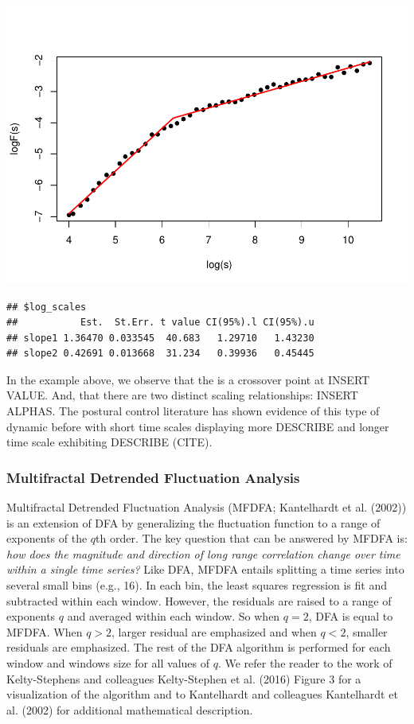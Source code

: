 \documentclass[
  man]{apa6}
\begin{document}
\includegraphics{fractal_regression_paper_brm_files/figure-latex/unnamed-chunk-6-1.pdf}

\begin{verbatim}
## $log_scales
##           Est.  St.Err. t value CI(95%).l CI(95%).u
## slope1 1.36470 0.033545  40.683   1.29710   1.43230
## slope2 0.42691 0.013668  31.234   0.39936   0.45445
\end{verbatim}

In the example above, we observe that the is a crossover point at INSERT
VALUE. And, that there are two distinct scaling relationships: INSERT
ALPHAS. The postural control literature has shown evidence of this type
of dynamic before with short time scales displaying more DESCRIBE and
longer time scale exhibiting DESCRIBE (CITE).

\hypertarget{multifractal-detrended-fluctuation-analysis}{%
\subsubsection{Multifractal Detrended Fluctuation Analysis}\label{multifractal-detrended-fluctuation-analysis}}

Multifractal Detrended Fluctuation Analysis (MFDFA;
Kantelhardt et al. (2002)) is an extension of DFA
by generalizing the fluctuation function to a range of exponents of the
\(q\)th order. The key question that can be answered by MFDFA is: \emph{how
does the magnitude and direction of long range correlation change over
time within a single time series?} Like DFA, MFDFA entails splitting a
time series into several small bins (e.g., 16). In each bin, the least
squares regression is fit and subtracted within each window. However,
the residuals are raised to a range of exponents \(q\) and averaged within
each window. So when \(q = 2\), DFA is equal to MFDFA. When \(q >2\), larger
residual are emphasized and when \(q < 2\), smaller residuals are
emphasized. The rest of the DFA algorithm is performed for each window
and windows size for all values of \(q\). We refer the reader to the work
of Kelty-Stephens and colleagues
Kelty-Stephen et al. (2016) Figure 3 for a
visualization of the algorithm and to Kantelhardt and colleagues
Kantelhardt et al. (2002) for additional
mathematical description.
\end{document}
